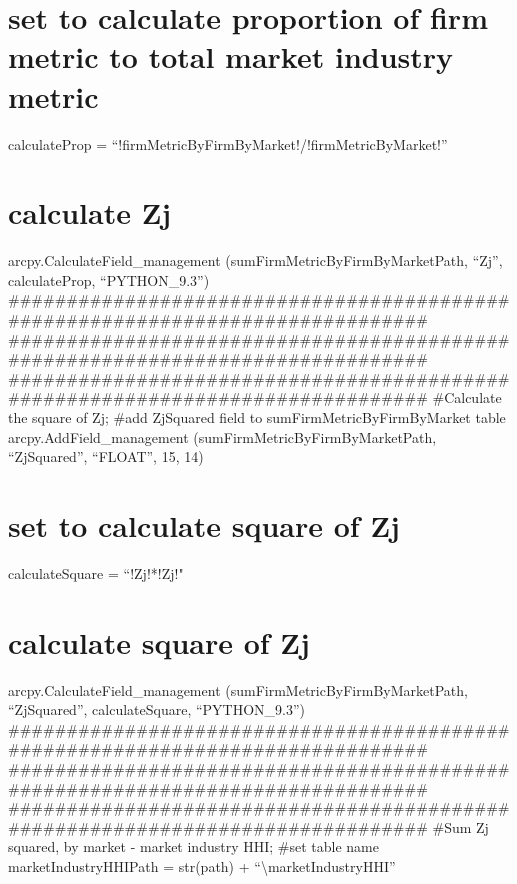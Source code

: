 \documentclass[]{article}
\begin{document}
\section{set to calculate proportion of firm metric to total market
industry
metric}\label{set-to-calculate-proportion-of-firm-metric-to-total-market-industry-metric}

calculateProp = ``!firmMetricByFirmByMarket!/!firmMetricByMarket!''

\section{calculate Zj}\label{calculate-zj}

arcpy.CalculateField\_management (sumFirmMetricByFirmByMarketPath,
``Zj'', calculateProp, ``PYTHON\_9.3'')
\#\#\#\#\#\#\#\#\#\#\#\#\#\#\#\#\#\#\#\#\#\#\#\#\#\#\#\#\#\#\#\#\#\#\#\#\#\#\#\#\#\#\#\#\#\#\#\#\#\#\#\#\#\#\#\#\#\#\#\#\#\#\#\#\#\#\#\#\#\#\#\#\#\#\#\#\#\#\#
\#\#\#\#\#\#\#\#\#\#\#\#\#\#\#\#\#\#\#\#\#\#\#\#\#\#\#\#\#\#\#\#\#\#\#\#\#\#\#\#\#\#\#\#\#\#\#\#\#\#\#\#\#\#\#\#\#\#\#\#\#\#\#\#\#\#\#\#\#\#\#\#\#\#\#\#\#\#\#
\#\#\#\#\#\#\#\#\#\#\#\#\#\#\#\#\#\#\#\#\#\#\#\#\#\#\#\#\#\#\#\#\#\#\#\#\#\#\#\#\#\#\#\#\#\#\#\#\#\#\#\#\#\#\#\#\#\#\#\#\#\#\#\#\#\#\#\#\#\#\#\#\#\#\#\#\#\#\#
\#Calculate the square of Zj; \#add ZjSquared field to
sumFirmMetricByFirmByMarket table arcpy.AddField\_management
(sumFirmMetricByFirmByMarketPath, ``ZjSquared'', ``FLOAT'', 15, 14)

\section{set to calculate square of
Zj}\label{set-to-calculate-square-of-zj}

calculateSquare = ``!Zj!*!Zj!"

\section{calculate square of Zj}\label{calculate-square-of-zj}

arcpy.CalculateField\_management (sumFirmMetricByFirmByMarketPath,
``ZjSquared'', calculateSquare, ``PYTHON\_9.3'')
\#\#\#\#\#\#\#\#\#\#\#\#\#\#\#\#\#\#\#\#\#\#\#\#\#\#\#\#\#\#\#\#\#\#\#\#\#\#\#\#\#\#\#\#\#\#\#\#\#\#\#\#\#\#\#\#\#\#\#\#\#\#\#\#\#\#\#\#\#\#\#\#\#\#\#\#\#\#\#
\#\#\#\#\#\#\#\#\#\#\#\#\#\#\#\#\#\#\#\#\#\#\#\#\#\#\#\#\#\#\#\#\#\#\#\#\#\#\#\#\#\#\#\#\#\#\#\#\#\#\#\#\#\#\#\#\#\#\#\#\#\#\#\#\#\#\#\#\#\#\#\#\#\#\#\#\#\#\#
\#\#\#\#\#\#\#\#\#\#\#\#\#\#\#\#\#\#\#\#\#\#\#\#\#\#\#\#\#\#\#\#\#\#\#\#\#\#\#\#\#\#\#\#\#\#\#\#\#\#\#\#\#\#\#\#\#\#\#\#\#\#\#\#\#\#\#\#\#\#\#\#\#\#\#\#\#\#\#
\#Sum Zj squared, by market - market industry HHI; \#set table name
marketIndustryHHIPath = str(path) +
``\textbackslash{}marketIndustryHHI''
\end{document}
